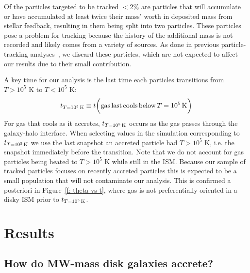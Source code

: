 \documentclass[fleqn,usenatbib]{mnras}
\newcommand{\tcon}{t_{T=10^5\,{\rm K}}}
\begin{document}
Of the particles targeted to be tracked $<2\%$ are particles that will accumulate or have accumulated at least twice their mass' worth in deposited mass from stellar feedback, resulting in them being split into two particles.
These particles pose a problem for tracking because the history of the additional mass is not recorded and likely comes from a variety of sources.
As done in previous particle-tracking analyses~\citep{Hafen2019, Hafen2020}, we discard these particles, which are not expected to affect our results due to their small contribution.

A key time for our analysis is the last time each particles transitions from $T > 10^5$ K to $T< 10^5$ K:
\begin{equation}
    \tcon \equiv t \bigg( {\rm gas\,last\,cools\,below}\,T=10^5\,{\rm K} \bigg)
\end{equation}
For gas that cools as it accretes, $\tcon$ occurs as the gas passes through the galaxy-halo interface.
When selecting values in the simulation corresponding to $\tcon$ we use the last snapshot an accreted particle had $T > 10^5$ K, i.e. the snapshot immediately before the transition.
Note that we do not account for gas particles being heated to $T > 10^5$ K while still in the ISM.
Because our sample of tracked particles focuses on recently accreted particles this is expected to be a small population that will not contaminate our analysis.
This is confirmed a posteriori in Figure~\ref{f: theta vs t}, where gas is not preferentially oriented in a disky ISM prior to $\tcon$.

\section{Results}
\label{s: results}


\subsection{How do MW-mass disk galaxies accrete?}
\label{s: characteristics}
\end{document}

